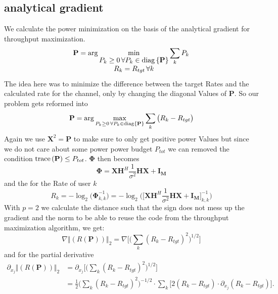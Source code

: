 \subsection{analytical gradient}
We calculate the power minimization on the basis of the analytical gradient for throughput maximization.
\begin{equation}
	\mathbf{P} = \arg{\min_{\begin{matrix}
		P_k\geq 0\,\forall P_k\in \ensuremath{\mathrm{diag}\left\lbrace\mathbf{P}\right\rbrace}\\
		R_k = R_{tgt}\,\forall k
		\end{matrix}}{\sum_k{P_k}}}
\end{equation}The idea here was to minimize the difference between the target Rates and the calculated rate for the channel, only by changing the diagonal Values of $\mathbf{P}$.
So our problem gets reformed into
\begin{equation}
	\mathbf{P} = \arg{\max_{P_k\geq 0\,\forall P_k\in \ensuremath{\mathrm{diag}\left\lbrace\mathbf{P}\right\rbrace}}{\sum_k{\bigr(R_k-R_{tgt}\bigl)}}}
\end{equation}
Again we use $\mathbf{X}^2 = \mathbf{P}$ to make sure to only get positive power Values but since we do not care about some power power budget $P_{tot}$ we can removed the condition $\text{trace}\left(\mathbf{P}\right)\leq P_{tot}$. $\mathbf{\Phi}$ then becomes
\begin{equation}
	\mathbf{\Phi} = \mathbf{X}\mathbf{H}^H\frac{1}{\sigma^2}\mathbf{H} \mathbf{X} + \mathbf{I_M}
\end{equation}
and the for the Rate of user $k$
\begin{equation}
	R_k = -\log_2\Biggr(\mathbf{\Phi}_{k,k}^{-1}\Biggl) = -\log_2\Biggr(\biggr[\mathbf{X}\mathbf{H}^H\frac{1}{\sigma^2}\mathbf{H} \mathbf{X} + \mathbf{I_M} \biggl]_{k,k}^{-1}\Biggl)
\end{equation}
With $p=2$ we calculate the distance such that the sign does not mess up the gradient and the norm to be able to reuse the code from the throughput maximization algorithm, we get:
\begin{equation}
	\nabla \bigr\Vert{(R(\mathbf{P}))\bigl\Vert}_2 = \nabla \Biggr[ \Biggr(\sum_k{(R_k-R_{tgt})^2}\Biggl)^{1/2} \Biggl]
\end{equation}
and for the partial derivative
\begin{align}
	\partial_{x_j} \bigr\Vert{(R(\mathbf{P}))\bigl\Vert}_2
	&=\partial_{x_j}\Biggr[\Biggr(\sum_k{(R_k-R_{tgt})^2}\Biggl)^{1/2}\Biggl]\\
	&=\frac{1}{2}\Biggr(\sum_k{(R_k-R_{tgt})^2}\Biggl)^{-1/2} \cdot \sum_k{\Biggr[2(R_k-R_{tgt}) \cdot \partial_{x_j}(R_k-R_{tgt})\Biggl]}.
\end{align}
